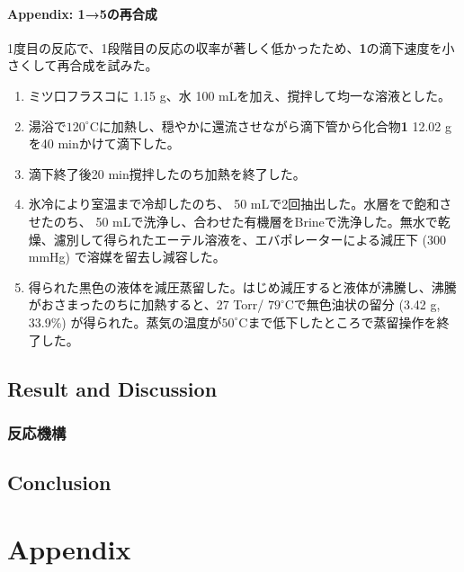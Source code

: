 \documentclass{ltjsarticle}
\theoremstyle{definition}
\numberwithin{equation}{section}
\newcommand{\D}{^\circ\text{C}}
\begin{document}
\paragraph{Appendix: \textbf{1}→\textbf{5}の再合成}
1度目の反応で、1段階目の反応の収率が著しく低かったため、\textbf{1}の滴下速度を小さくして再合成を試みた。
\begin{enumerate}
\item ミツ口フラスコに 1.15 g、水 100 mLを加え、撹拌して均一な溶液とした。
\item 湯浴で$120\D$に加熱し、穏やかに還流させながら滴下管から化合物\textbf{1} 12.02 gを40 minかけて滴下した。 
\item 滴下終了後20 min撹拌したのち加熱を終了した。
\item 氷冷により室温まで冷却したのち、 50 mLで2回抽出した。水層をで飽和させたのち、 50 mLで洗浄し、合わせた有機層をBrineで洗浄した。無水で乾燥、濾別して得られたエーテル溶液を、エバポレーターによる減圧下 (300 mmHg) で溶媒を留去し減容した。
\item 得られた黒色の液体を減圧蒸留した。はじめ減圧すると液体が沸騰し、沸騰がおさまったのちに加熱すると、27 Torr/ $79\D$で無色油状の留分 (3.42 g, 33.9\%) が得られた。蒸気の温度が$50\D$まで低下したところで蒸留操作を終了した。
\end{enumerate}

\subsection{Result and Discussion}
\subsubsection{反応機構}

\subsection{Conclusion}
\newpage
\section{Appendix}
\end{document}
